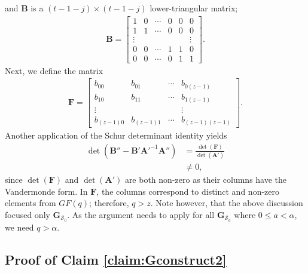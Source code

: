 \documentclass[journal,twocolumn]{IEEEtran}
\theoremstyle{definition}
\newcommand{\calS}{\mathcal{S}}
\newcommand{\bfG}{\mathbf{G}}
\newcommand{\bfA}{\mathbf{A}}
\newcommand{\bfB}{\mathbf{B}}
\newcommand{\bfF}{\mathbf{F}}
\newcommand{\aditya}[1]{\marginpar{+}{\bf Aditya's remark}: {\em #1}}
\begin{document}
and $\bfB$ is a $(t-1-j)\times (t-1-j)$ lower-triangular matrix;
\begin{align*}
\bfB=\begin{bmatrix}
1&0&\cdots&0&0&0\\
1&1&\cdots&0&0&0\\
\vdots&&&&&\vdots\\
0&0&\cdots&1&1&0\\
0&0&\cdots&0&1&1
\end{bmatrix}.
\end{align*}
Next, we define the matrix
\begin{align*}
\bfF= \begin{bmatrix}
b_{00}&b_{01}&\cdots&b_{0(z-1)}\\
b_{10}&b_{11}&\cdots&b_{1(z-1)}\\
\vdots&&&\vdots\\
b_{(z-1)0}&b_{(z-1)1}&\cdots&b_{(z-1)(z-1)}
\end{bmatrix}.
\end{align*}
Another application of the Schur determinant identity yields
\begin{align*}
\det(\bfB''-\bfB'\bfA'^{-1}\bfA'')&=\frac{\det(\bfF)}{\det(\bfA')}\\
&\neq 0,
\end{align*}
since $\det(\bfF)$ and $\det(\bfA')$ are both non-zero as their columns have the Vandermonde form. In $\bfF$, the columns correspond to distinct and non-zero elements from $GF(q)$; therefore, $q>z$. Note however, that the above discussion focused only $\bfG_{\calS_0}$. As the argument needs to apply for all $\bfG_{\calS_a}$ where $0 \leq a < \alpha$, we need $q > \alpha$.

\subsection*{Proof of Claim \ref{claim:Gconstruct2}}
\end{document}
